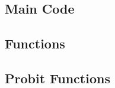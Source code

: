 \documentclass[11pt,letterpaper]{article}
\begin{document}


\subsection{Main Code}

\subsection{Functions}

\subsection{Probit Functions}

\end{document}
